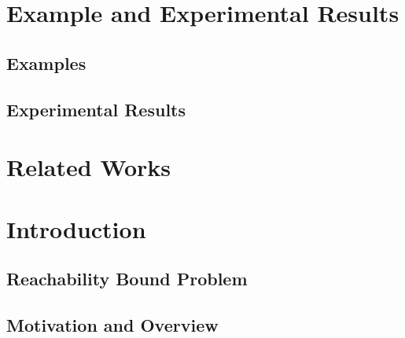 \documentclass[12pt, letterpaper]{report}   %
\begin{document}
\chapter{Example and Experimental Results}
\label{sec:adapt-implementation}
\section{Examples}
\label{sec:adapt-example}

\section{Experimental Results}
\label{sec:adapt-eval}


\chapter{Related Works}
\label{sec:adapt-relatedwork}






\chapter*{ }

\chapter{Introduction }
\label{sec:reachability-intro}
\section{Reachability Bound Problem}
\label{sec:reachability-background}

\section{Motivation and Overview}
\label{sec:reachability-motivation}
\end{document}
